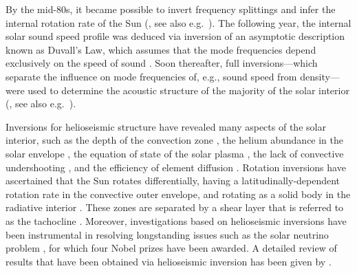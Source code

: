 By the mid-80s, it became possible to invert frequency splittings and infer the internal rotation rate of the Sun (\citealt{1984Natur.310...22D}, see also e.g.~\citealt{1998ApJ...505..390S, 2009LRSP....6....1H}). 
The following year, the internal solar sound speed profile was deduced via inversion of an asymptotic description known as Duvall's Law, which assumes that the mode frequencies depend exclusively on the speed of sound \citep{1985Natur.315..378C}. 
Soon thereafter, full inversions---which separate the influence on mode frequencies of, e.g., sound speed from density---were used to determine the acoustic structure of the majority of the solar interior (\citealt{1985SoPh..100...65G}, see also e.g.~\citealt{1990MNRAS.244..542D, GoughThompson1991, 1991ARA&A..29..627G, 1994a&as..107..421a, 2009ApJ...699.1403B}). 

Inversions for helioseismic structure have revealed many aspects of the solar interior, such as the depth of the convection zone \citep[e.g.,][]{1991ApJ...378..413C, 1997MNRAS.287..189B}, the helium abundance in the solar envelope \citep[e.g.,][]{1991LNP...388..111D, 1998MNRAS.298..719B}, the equation of state of the solar plasma \citep{1997A&A...322L...5B}, the lack of convective undershooting \citep{1994MNRAS.267..209B}, and the efficiency of element diffusion \citep{1993ApJ...403L..75C}. 
Rotation inversions have ascertained that the Sun rotates differentially, having a latitudinally-dependent rotation rate in the convective outer envelope, and rotating as a solid body in the radiative interior \citep[e.g.,][]{2009LRSP....6....1H}. 
These zones are separated by a shear layer that is referred to as the tachocline \citep[][]{1992A&A...265..106S}. 
Moreover, investigations based on helioseismic inversions have been instrumental in resolving longstanding issues such as the solar neutrino problem \citep[e.g.,][]{1998PhLB..433....1B}, for which four Nobel prizes have been awarded. 
A detailed review of results that have been obtained via helioseismic inversion has been given by \citet{2016lrsp...13....2b}. 





